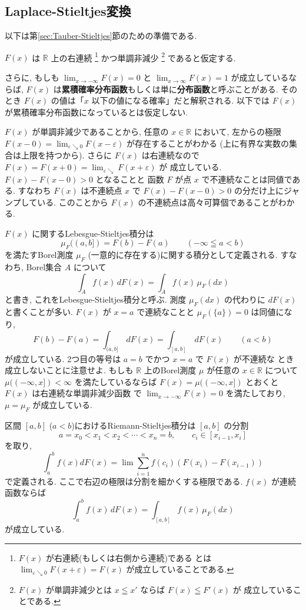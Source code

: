 \documentclass[12pt,twoside]{jarticle}
\newcommand\R{{\mathbb R}} %
\newcommand\eps{\varepsilon}
\theoremstyle{jplain}
\theoremstyle{jplain}
\theoremstyle{jplain}
\numberwithin{theorem}{section}
\numberwithin{equation}{section}
\numberwithin{figure}{section}
\numberwithin{table}{section}
\newcommand\secref[1]{第\ref{#1}節}
\begin{document}

\subsection{Laplace-Stieltjes変換}
\label{sec:Laplace-Stieltjes}

以下は\secref{sec:Tauber-Stieltjes}のための準備である.

$F(x)$ は $\R$ 上の右連続%
\footnote{$F(x)$ が右連続(もしくは右側から連続)である
とは $\lim_{\eps\searrow 0}F(x+\eps)=F(x)$ が成立していることである.}%
かつ単調非減少%
\footnote{$F(x)$ が単調非減少とは $x\leqq x'$ ならば $F(x)\leqq F'(x)$ が
成立していることである.}%
であると仮定する.

さらに, もしも $\lim_{x\to-\infty}F(x)=0$ と
$\lim_{x\to\infty}F(x)=1$ が成立しているならば,  
$F(x)$ は{\bf 累積確率分布函数}もしくは単に{\bf 分布函数}と呼ぶことがある.
そのとき $F(x)$ の値は「$x$ 以下の値になる確率」だと解釈される.
以下では $F(x)$ が累積確率分布函数になっているとは仮定しない.


$F(x)$ が単調非減少であることから, 任意の $x\in\R$ において, 
左からの極限 $F(x-0)=\lim_{\eps\searrow0}F(x-\eps)$ が存在することがわかる
(上に有界な実数の集合は上限を持つから).
さらに $F(x)$ は右連続なので $F(x)=F(x+0)=\lim_{\eps\searrow}F(x+\eps)$ が
成立している.  $F(x)-F(x-0)>0$ となることと
函数 $F$ が点 $x$ で不連続なことは同値である.
すなわち $F(x)$ は不連続点 $x$ で $F(x)-F(x-0)>0$ の分だけ上にジャンプしている.
このことから $F(x)$ の不連続点は高々可算個であることがわかる.

$F(x)$ に関するLebesgue-Stieltjes積分は
\[
\mu_F((a,b]) = F(b)-F(a) \qquad (-\infty\leqq a<b)
\]
を満たすBorel測度 $\mu_F$ (一意的に存在する)に関する積分として定義される.
すなわち, Borel集合 $A$ について
\[
\int_A f(x)\,dF(x)
=
\int_A f(x)\,\mu_F(dx)
\]
と書き, これをLebesgue-Stieltjes積分と呼ぶ. 
測度 $\mu_F(dx)$ の代わりに $dF(x)$ と書くことが多い.
$F(x)$ が $x=a$ で連続なことと $\mu_F(\{a\})=0$ は同値になり,
\[
F(b)-F(a) = \int_{(a,b]}\,dF(x) = \int_{[a,b]}\,dF(x)
\qquad (a<b)
\]
が成立している. 2つ目の等号は $a=b$ でかつ $x=a$ で $F(x)$ が不連続な
とき成立しないことに注意せよ.
もしも $\R$ 上のBorel測度 $\mu$ が任意の $x\in\R$ について $\mu((-\infty,x])<\infty$
を満たしているならば $F(x)=\mu((-\infty,x])$ とおくと $F(x)$ は右連続な単調非減少函数
で $\lim_{x\to-\infty}F(x)=0$ を満たしており, $\mu=\mu_F$ が成立している. 

区間 $[a,b]$ ($a<b$)におけるRiemann-Stieltjes積分は
$[a,b]$ の分割
\[
a=x_0< x_1<x_2<\cdots<x_n=b, \qquad c_i\in[x_{i-1},x_i]
\]
を取り,  
\[
\int_a^b f(x)dF(x)
=\lim \sum_{i=1}^n f(c_i)(F(x_i)-F(x_{i-1}))
\]
で定義される. ここで右辺の極限は分割を細かくする極限である.
$f(x)$ が連続函数ならば
\[
\int_a^b f(x)\,dF(x) = \int_{[a,b]} f(x)\,\mu_F(dx)
\]
が成立している. 
\end{document}
